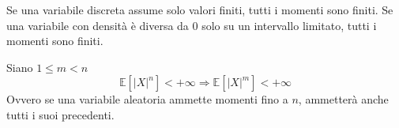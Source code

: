\begin{observation}
	Se una variabile discreta assume solo valori finiti, tutti i momenti sono finiti. Se una variabile con densità è diversa da $0$ solo su un intervallo limitato, tutti i momenti sono finiti.
\end{observation}

\begin{proposition}
	Siano $1 \leq m < n$
	\begin{equation}
		\mathbb{E}[\lvert X \rvert ^n] < +\infty \Longrightarrow \mathbb{E}[\lvert X \rvert ^m] < +\infty
	\end{equation}
	Ovvero se una variabile aleatoria ammette momenti fino a $n$, ammetterà anche tutti i suoi precedenti.
\end{proposition}